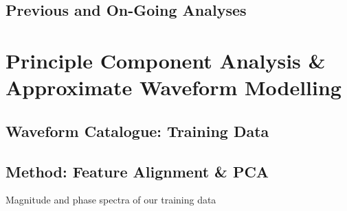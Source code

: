 \documentclass[a0,landscape]{a0poster}
\begin{document}
\begin{multicols}{4}
\subsection*{Previous and On-Going Analyses}


\section*{Principle Component Analysis \& Approximate Waveform Modelling}

\subsection*{Waveform Catalogue: Training Data}

\subsection*{Method: Feature Alignment \& PCA}

%
%

%
%
\begin{minipage}{\columnwidth}
\makeatletter
\newcommand{\@captype}{figure}
\makeatother
\centering
{}\qquad%
\caption{Magnitude and phase spectra of our training data}
\end{minipage}


\end{multicols}
\end{document}
